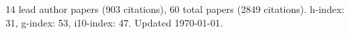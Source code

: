 14 lead author papers (903 citations),
60 total papers (2849 citations).\newline
h-index: 31, g-index: 53, i10-index: 47. Updated \today.